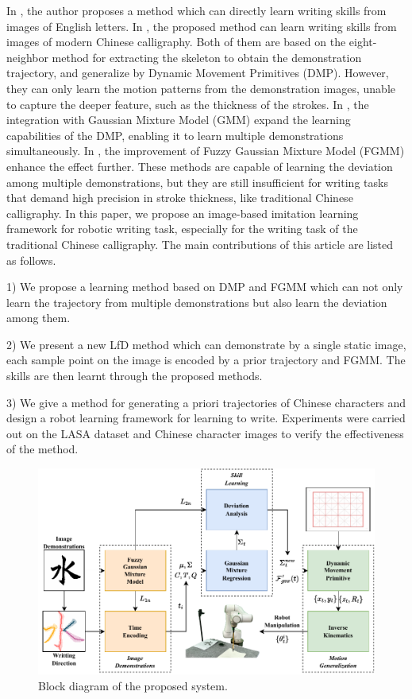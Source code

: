 \documentclass[conference]{IEEEtran}
\begin{document}
In \cite{Zhang2023}, the author proposes a method which can directly learn writing skills from images of English letters. In \cite{Li2021,Li2022,Li2024}, the proposed method can learn writing skills from images of modern Chinese calligraphy. Both of them are based on the eight-neighbor method for extracting the skeleton to obtain the demonstration trajectory, and generalize by Dynamic Movement Primitives (DMP)\cite{Ijspeert2013}. However, they can only learn the motion patterns from the demonstration images, unable to capture the deeper feature, such as the thickness of the strokes. In \cite{Yang2019}, the integration with Gaussian Mixture Model (GMM) expand the learning capabilities of the DMP, enabling it to learn multiple demonstrations simultaneously. In \cite{Yang2019c}, the improvement of Fuzzy Gaussian Mixture Model (FGMM)\cite{Ju2012} enhance the effect further. These methods are capable of learning the deviation among multiple demonstrations, but they are still insufficient for writing tasks that demand high precision in stroke thickness, like traditional Chinese calligraphy. In this paper, we propose an image-based imitation learning framework for robotic writing task, especially for the writing task of the traditional Chinese calligraphy. The main contributions of this article are listed as follows. 

1) We propose a learning method based on DMP and FGMM which can not only learn the trajectory from multiple demonstrations but also learn the deviation among them.

2) We present a new LfD method which can demonstrate by a single static image, each sample point on the image is encoded by a prior trajectory and FGMM. The skills are then learnt through the proposed methods.

3) We give a method for generating a priori trajectories of Chinese characters and design a robot learning framework for learning to write. Experiments were carried out on the LASA dataset and Chinese character images to verify the effectiveness of the method.
\begin{figure}[!t]
    \centering
    \includegraphics[width=6in]{./fig/fig1.pdf}
    \caption{Block diagram of the proposed system.}
    \label{fig1}
\end{figure}
\end{document}
